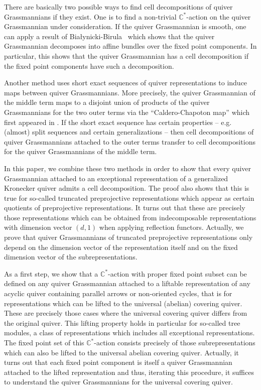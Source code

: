 \documentclass[smallextended,envcountsect,envcountsame]{svjour3}
\numberwithin{equation}{section}
\newcommand{\CC}{\mathbb{C}}
\begin{document}
There are basically two possible ways to find cell decompositions of quiver Grassmannians if they exist.
One is to find a non-trivial $\CC^*$-action on the quiver Grassmannian under consideration.
If the quiver Grassmannian is smooth, one can apply a result of Bia\l{}ynicki-Birula~\cite{bb} which shows that the quiver Grassmannian decomposes into affine bundles over the fixed point components.
In particular, this shows that the quiver Grassmannian has a cell decomposition if the fixed point components have such a decomposition.

Another method uses short exact sequences of quiver representations to induce maps between quiver Grassmannians.
More precisely, the quiver Grassmannian of the middle term maps to a disjoint union of products of the quiver Grassmannians for the two outer terms via the ``Caldero-Chapoton map'' which first appeared in \cite{cc}. 
If the short exact sequence has certain properties -- e.g. (almost) split sequences and certain generalizations -- then cell decompositions of quiver Grassmannians attached to the outer terms transfer to cell decompositions for the quiver Grassmannians of the middle term.

In this paper, we combine these two methods in order to show that every quiver Grassmannian attached to an exceptional representation of a generalized Kronecker quiver admits a cell decomposition.
The proof also shows that this is true for so-called truncated preprojective representations which appear as certain quotients of preprojective representations.
It turns out that these are precisely those representations which can be obtained from indecomposable representations with dimension vector $(d,1)$ when applying reflection functors.
Actually, we prove that quiver Grassmannians of truncated preprojective representations only depend on the dimension vector of the representation itself and on the fixed dimension vector of the subrepresentations.

As a first step, we show that a $\CC^*$-action with proper fixed point subset can be defined on any quiver Grassmannian attached to a liftable representation of any acyclic quiver containing parallel arrows or non-oriented cycles, that is for representations which can be lifted to the universal (abelian) covering quiver.
These are precisely those cases where the universal covering quiver differs from the original quiver.
This lifting property holds in particular for so-called tree modules, a class of representations which includes all exceptional representations.
The fixed point set of this $\CC^*$-action consists precisely of those subrepresentations which can also be lifted to the universal abelian covering quiver.
Actually, it turns out that each fixed point component is itself a quiver Grassmannian attached to the lifted representation and thus, iterating this procedure, it suffices to understand the quiver Grassmannians for the universal covering quiver.
\end{document}
